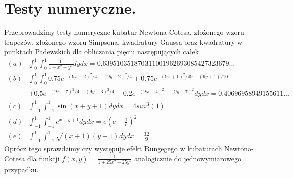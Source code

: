 \documentclass[10pt,wide]{mwart}
\theoremstyle{definition}
\begin{document}
\section{Testy numeryczne.}
Przeprowadzimy testy numeryczne kubatur Newtona-Cotesa, złożonego wzoru trapezów, złożonego wzoru Simpsona, kwadratury Gaussa oraz kwadratury w punktach Padewskich dla obliczania pięciu następujących całek
 \begin{equation*}
   \begin{split}
   (a) & \int_{0}^{1} \int_{0}^{1} \frac{1}{1+x^2+y^2} dydx = 0.639510351870311001962693085427323679\dots \\
   (b) & \int_{0}^{1} \int_{0}^{1} 0.75e^{-(9x-2)^2/4 - (9y-2)^2/4} + 0.75e^{-(9x+1)^2/49 - (9y+1)/10} \\
& + 0.5e^{-(9x-7)^2/4 - (9y-3)^2/4} -0.2 e^{-(9x-4)^2 - (9y-7)^2} dydx = 0.40696958949155611\dots \\
  (c) & \int_{-1}^{1} \int_{-1}^{1} \sin(x+y+1) dydx = 4sin^3(1) \\
  (d) & \int_{-1}^{1} \int_{-1}^{1} e^{x+y+1} dydx = e(e-\frac{1}{e})^2 \\
  (e) & \int_{-1}^{1} \int_{-1}^{1} \sqrt{(x+1)(y+1)} dydx = \frac{32}{9}
  \end{split}
 \end{equation*}
 Oprócz tego sprawdzimy czy występuje efekt Rungegego w kubaturach Newtona-Cotesa dla funkcji \(f(x,y) = \frac{1}{1 + 25x^2 + 25y^2}\) analogicznie do jednowymiarowego przypadku.
\end{document}
